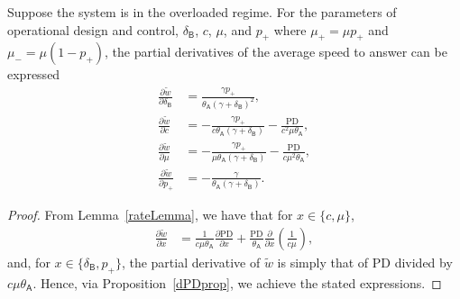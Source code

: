 \documentclass[manuscript,screen,authorversion]{acmart}
\begin{document}
\begin{proposition}\label{dASAprop}
Suppose the system is in the overloaded regime. For the parameters of operational design and control, $\delta_\mathsf{B}$, $c$, $\mu$, and $p_+$ where $\mu_+ = \mu p_+$ and $\mu_- = \mu(1-p_+)$, the partial derivatives of the average speed to answer can be expressed
\begin{align}
\frac{\partial \tilde w}{\partial \delta_\mathsf{B}}
&=
\frac{\gamma p_+ }{\theta_\mathsf{A}(\gamma + \delta_\mathsf{B})^2}
,
\\
\frac{\partial \tilde w}{\partial c}
&=
-
\frac{\gamma p_+}{c\theta_\mathsf{A}(\gamma + \delta_\mathsf{B})}
-
\frac{\mathrm{PD}}{c^2 \mu \theta_\mathsf{A}}
,
\\
\frac{\partial \tilde w}{\partial \mu}
&=
-
\frac{\gamma p_+}{\mu \theta_\mathsf{A}(\gamma + \delta_\mathsf{B})}
-
\frac{\mathrm{PD}}{c\mu^2\theta_\mathsf{A}}
,
\\
\frac{\partial \tilde w}{\partial p_+}
&=
-
\frac{\gamma }{\theta_\mathsf{A}(\gamma + \delta_\mathsf{B})}
.
\end{align}
\end{proposition}
\begin{proof}
From Lemma~\ref{rateLemma}, we have that for $x \in \{c,\mu\}$, 
\begin{align}
\frac{\partial \tilde w}{\partial x}
&=
\frac{1}{c\mu \theta_\mathsf{A}} \frac{\partial \mathrm{PD}}{\partial x}
+
\frac{\mathrm{PD}}{\theta_\mathsf{A}}
\frac{\partial}{\partial x}
\left(
\frac{1}{c\mu}
\right)
,
\end{align}
and, for $x \in \{\delta_\mathsf{B}, p_+\}$, the partial derivative of $\tilde w$ is simply that of $\mathrm{PD}$ divided by $c\mu \theta_\mathsf{A}$. Hence, via Proposition~\ref{dPDprop}, we achieve the stated expressions.
\end{proof}
\end{document}
